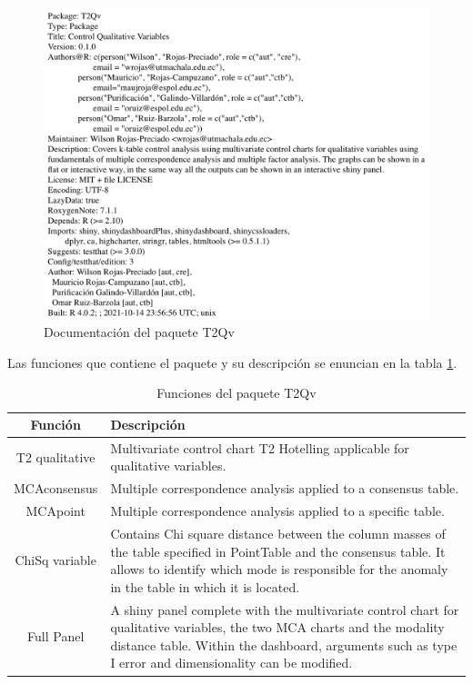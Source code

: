 \documentclass[water,article,submit,moreauthors,pdftex]{mdpi}
\begin{document}
\begin{figure}[!ht]



\begin{center}\includegraphics[width=0.6\linewidth,]{DescrPack} \end{center}

\caption{Documentación del paquete T2Qv}

\label{fig:documentation}
\end{figure}

Las funciones que contiene el paquete y su descripción se enuncian en la
tabla \ref{tab:functions}.

\begin{table}[!ht]
\begin{center}
 \begin{tabular}{||c  m{35em}||} 
 \hline
  Función & Descripción \\ [0.5ex] 
 \hline\hline
 T2 qualitative & Multivariate control chart T2 Hotelling applicable for qualitative variables.\\
 \hline
  MCAconsensus & Multiple correspondence analysis applied to a consensus table.\\
\hline
  MCApoint & Multiple correspondence analysis applied to a specific table.\\
\hline
  ChiSq variable & Contains Chi square distance between the column masses of the table specified in PointTable and the consensus table. It allows to identify which mode is responsible for the anomaly in the table in which it is located. \\ [1ex] 
  \hline
  Full Panel & A shiny panel complete with the 
  multivariate control chart for 
  qualitative variables, the two MCA 
  charts and the modality distance table. 
  Within the dashboard, arguments such as 
  type I error and dimensionality can be 
  modified. \\ [1ex] 
 \hline
\end{tabular}\caption{Funciones del paquete T2Qv}
\label{tab:functions}
\end{center}
\end{table}
\end{document}
